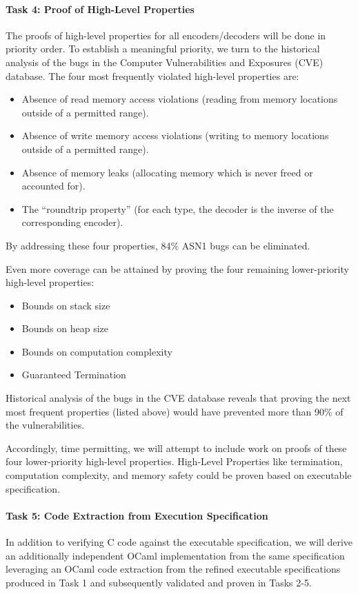\documentclass[10p,conference]{IEEEtran}
\begin{document}
\paragraph{Task 4: Proof of High-Level Properties} 
The proofs of high-level properties for all encoders/decoders will be done in priority order. To establish a meaningful priority, we turn to the historical analysis of the bugs in the Computer Vulnerabilities and Exposures (CVE) database. The four most frequently violated high-level properties are:
\begin{itemize}

\item Absence of read memory access violations (reading from memory locations outside of a permitted range).
\item Absence of write memory access violations (writing to memory locations outside of a permitted range).
\item Absence of memory leaks (allocating memory which is never freed or accounted for).
\item The ``roundtrip property'' (for each type, the decoder is the inverse of the corresponding encoder).
\end{itemize}

By addressing these four properties, 84\% ASN1 bugs can be eliminated.

Even more coverage can be attained by proving the four remaining lower-priority high-level properties:
\begin{itemize}
\item Bounds on stack size
\item Bounds on heap size
\item Bounds on computation complexity
\item Guaranteed Termination
\end{itemize}
Historical analysis of the bugs in the CVE database reveals that proving the next most frequent properties (listed above) would have prevented more than 90\% of the vulnerabilities. 

Accordingly, time permitting, we will attempt to include work on proofs of these four lower-priority high-level properties. High-Level Properties like termination, computation complexity, and memory safety could be proven based on executable specification. 

\paragraph{Task 5: Code Extraction from Execution Specification}
In addition to verifying C code against the executable specification, we will derive an additionally independent OCaml implementation from the same specification leveraging an OCaml code extraction from the refined executable specifications produced in Task 1 and subsequently validated and proven in Tasks 2-5. 
\end{document}
